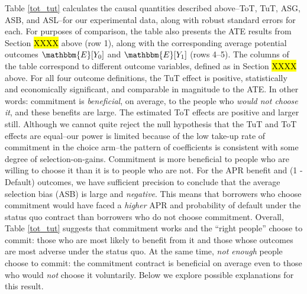 \documentclass[oneside,11pt]{article}
\begin{document}
Table \ref{tot_tut} calculates the causal quantities described above--ToT, TuT, ASG, ASB, and ASL--for our experimental data, along with robust standard errors for each. 
For purposes of comparison, the table also presents the ATE results from Section \hl{XXXX} above (row 1), along with the corresponding average potential outcomes $\mathbbm{E}[Y_0]$ and $\mathbbm{E}[Y_1]$ (rows 4--5).
The columns of the table correspond to different outcome variables, defined as in Section \hl{XXXX} above.
For all four outcome definitions, the TuT effect is positive, statistically and economically significant, and comparable in magnitude to the ATE.
In other words: commitment is \emph{beneficial}, on average, to the people who \emph{would not choose it}, and these benefits are large.
The estimated ToT effects are positive and larger still.
Although we cannot quite reject the null hypothesis that the TuT and ToT effects are equal--our power is limited because of the low take-up rate of commitment in the choice arm--the pattern of coefficients is consistent with some degree of selection-on-gains.
Commitment is more beneficial to people who are willing to choose it than it is to people who are not.
For the APR benefit and (1 - Default) outcomes, we have sufficient precision to conclude that the average selection bias (ASB) is large and \emph{negative}.
This means that borrowers who choose commitment would have faced a \emph{higher} APR and probability of default under the status quo contract than borrowers who do not choose commitment. 
Overall, Table \ref{tot_tut} suggests that commitment works and the ``right people'' choose to commit: those who are most likely to benefit from it and those whose outcomes are most adverse under the status quo. At the same time, \emph{not enough} people choose to commit: the commitment contract is beneficial on average even to those who would \emph{not} choose it voluntarily. Below we explore possible explanations for this result.
\end{document}
